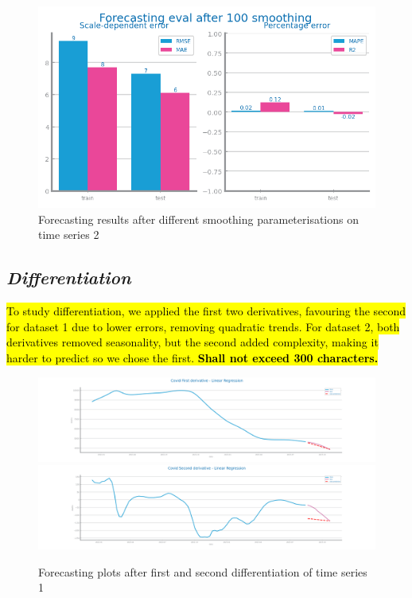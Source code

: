 \documentclass[10pt]{extarticle}
\newcommand{\ctext}[3][RGB]{%
  \begingroup
  \definecolor{hlcolor}{#1}{#2}\sethlcolor{hlcolor}%
  \hl{#3}%
  \endgroup
}
\begin{document}
\begin{figure}[H]
\includegraphics[scale=0.5]{images/dataset2/time_series/fts_forecast_eval_after_smooth_ws_100.png}
\caption{Forecasting results after different smoothing parameterisations on time series 2}
\end{figure}

\subsection*{\textit{Differentiation}}
\ctext[RGB]{190,190,190}{To study differentiation, we applied the first two derivatives, favouring the second for dataset 1 due to lower errors, removing quadratic trends. For dataset 2, both derivatives removed seasonality, but the second added complexity, making it harder to predict so we chose the first.  \textbf{Shall not exceed 300 characters.}}

\begin{figure}[H]
\centering\includegraphics[scale=0.4]{images/dataset1/time_series/Covid First derivative - Linear Regression_forecasting_series.png}
\includegraphics[scale=0.4]{images/dataset1/time_series/Covid Second derivative - Linear Regression_forecasting_series.png}
\caption{Forecasting plots after first and second differentiation of time series 1}
\end{figure}
\end{document}
